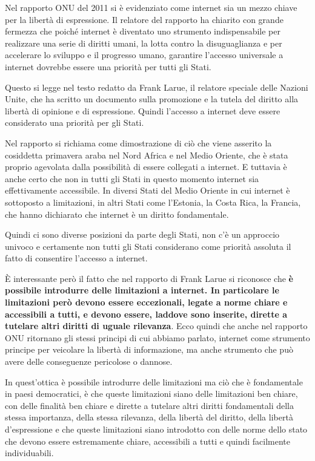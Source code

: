 Nel rapporto ONU del 2011 si è evidenziato come internet sia un mezzo chiave per la libertà di espressione. Il relatore del rapporto ha chiarito con grande fermezza che poiché internet è diventato uno strumento indispensabile per realizzare una serie di diritti umani, la lotta contro la disuguaglianza e per accelerare lo sviluppo e il progresso umano, garantire l'accesso universale a internet dovrebbe essere una priorità per tutti gli Stati.

Questo si legge nel testo redatto da Frank Larue, il relatore speciale delle Nazioni Unite, che ha scritto un documento sulla promozione e la tutela del diritto alla libertà di opinione e di espressione. Quindi l'accesso a internet deve essere considerato una priorità per gli Stati.

Nel rapporto si richiama come dimostrazione di ciò che viene asserito la cosiddetta primavera araba nel Nord Africa e nel Medio Oriente, che è stata proprio agevolata dalla possibilità di essere collegati a internet. E tuttavia è anche certo che non in tutti gli Stati in questo momento internet sia effettivamente accessibile. In diversi Stati del Medio Oriente in cui internet è sottoposto a limitazioni, in altri Stati come l'Estonia, la Costa Rica, la Francia, che hanno dichiarato che internet è un diritto fondamentale. 

Quindi ci sono diverse posizioni da parte degli Stati, non c'è un approccio univoco e certamente non tutti gli Stati considerano come priorità assoluta il fatto di consentire l'accesso a internet.

È interessante però il fatto che nel rapporto di Frank Larue si riconosce che \textbf{è possibile introdurre delle limitazioni a internet. In particolare le limitazioni però devono essere eccezionali, legate a norme chiare e accessibili a tutti, e devono essere, laddove sono inserite, dirette a tutelare altri diritti di uguale rilevanza}. Ecco quindi che anche nel rapporto ONU ritornano gli stessi principi di cui abbiamo parlato, internet come strumento principe per veicolare la libertà di informazione, ma anche strumento che può avere delle conseguenze pericolose o dannose.

In quest'ottica è possibile introdurre delle limitazioni ma ciò che è fondamentale in paesi democratici, è che queste limitazioni siano delle limitazioni ben chiare, con delle finalità ben chiare e dirette a tutelare altri diritti fondamentali della stessa importanza, della stessa rilevanza, della libertà del diritto, della libertà d'espressione e che queste limitazioni siano introdotto con delle norme dello stato che devono essere estremamente chiare, accessibili a tutti e quindi facilmente individuabili.

